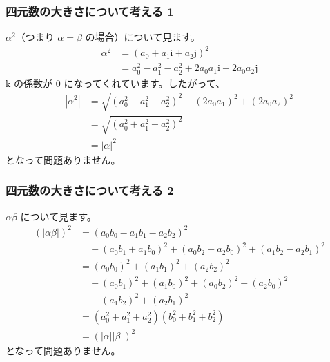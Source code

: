 \documentclass{beamer}
\newcommand{\ii}{\mathrm{i}}
\newcommand{\jj}{\mathrm{j}}
\newcommand{\kk}{\mathrm{k}}
\begin{document}
\begin{frame}
    \frametitle{四元数の大きさについて考える 1}

    \(\alpha^2\)（つまり \(\alpha = \beta\) の場合）について見ます。
    \begin{align*}
        \alpha^2 & = (a_0 + a_1 \ii + a_2 \jj)^2                           \\
                 & = a_0^2 - a_1^2 - a_2^2 + 2 a_0 a_1 \ii + 2 a_0 a_2 \jj
    \end{align*}
    \(\kk\) の係数が \(0\) になってくれています。したがって、
    \begin{align*}
        |\alpha^2| & = \sqrt{(a_0^2 - a_1^2 - a_2^2)^2 + (2 a_0 a_1)^2 + (2 a_0 a_2)^2} \\
                   & = \sqrt{(a_0^2 + a_1^2 + a_2^2)^2}                                 \\
                   & = |\alpha|^2
    \end{align*}
    となって問題ありません。
\end{frame}

\begin{frame}
    \frametitle{四元数の大きさについて考える 2}

    \(\alpha \beta\) について見ます。
    \begin{align*}
        (|\alpha \beta|)^2 & = (a_0 b_0 - a_1 b_1 - a_2 b_2)^2                                             \\
                           & \quad + (a_0 b_1 + a_1 b_0)^2 + (a_0 b_2 + a_2 b_0)^2 + (a_1 b_2 - a_2 b_1)^2 \\
                           & = (a_0 b_0)^2 + (a_1 b_1)^2 + (a_2 b_2)^2                                     \\
                           & \quad + (a_0 b_1)^2 + (a_1 b_0)^2 + (a_0 b_2)^2 + (a_2 b_0)^2                 \\
                           & \quad + (a_1 b_2)^2 + (a_2 b_1)^2                                             \\
                           & = (a_0^2 + a_1^2 + a_2^2)(b_0^2 + b_1^2 + b_2^2)                              \\
                           & = (|\alpha| |\beta|)^2
    \end{align*}
    となって問題ありません。
\end{frame}
\end{document}
